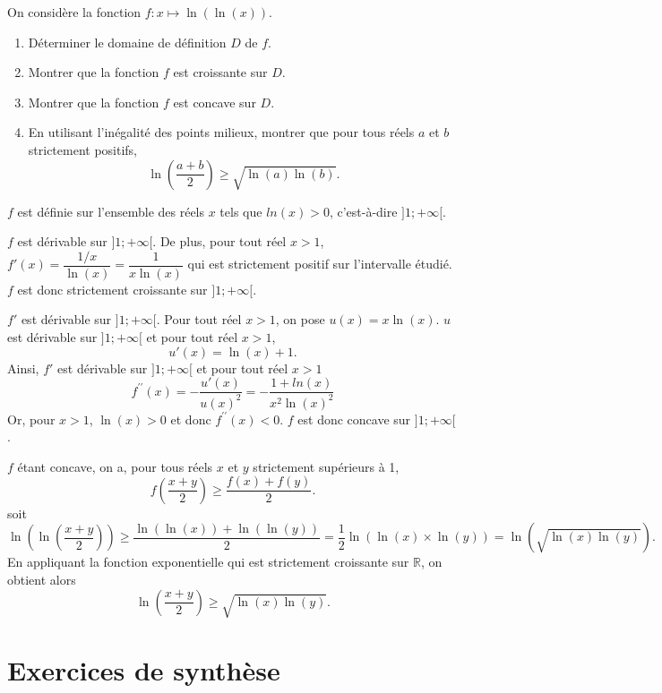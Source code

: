 \documentclass[11pt,fleqn, openany]{book} %
\begin{document}
\begin{exercise}On considère la fonction $f : x \mapsto \ln( \ln(x))$.
\begin{enumerate}
\item Déterminer le domaine de définition $D$ de $f$.
\item Montrer que la fonction $f$ est croissante sur $D$.
\item Montrer que la fonction $f$ est concave sur $D$.
\item En utilisant l'inégalité des points milieux, montrer que pour tous réels $a$ et $b$ strictement positifs,
\[ \ln \left( \dfrac{a+b}{2}\right) \geqslant \sqrt{\ln(a) \ln(b)}.\]
\end{enumerate}\end{exercise}

\begin{solution}
\(f\) est définie sur l'ensemble des réels \(x\) tels que \(ln(x)>0\), c'est-à-dire \(]1;+\infty[\).

\(f\) est dérivable sur  \(]1;+\infty[\). De plus, pour tout réel \(x>1\), \(f'(x)=\dfrac{1/x}{\ln(x)}=\dfrac{1}{x\ln(x)}\) qui est strictement positif sur l'intervalle étudié. \(f\) est donc strictement croissante sur \(]1;+\infty[\).

\(f'\) est dérivable sur \(]1;+\infty[\). Pour tout réel \(x>1\), on pose \(u(x)=x\ln(x)\). \(u\) est dérivable sur \(]1;+\infty[\) et pour tout réel \(x>1\),
\[u'(x)=\ln(x)+1.\]
Ainsi, \(f'\) est dérivable sur \(]1;+\infty[\) et pour tout réel \(x>1\)
\[f^{\prime\prime}(x)= -\dfrac{u'(x)}{u(x)^2}=-\dfrac{1+ln(x)}{x^2\ln(x)^2}\]
Or, pour \(x>1\), \(\ln(x)>0\) et donc \(f^{\prime\prime}(x)<0\).  \(f\) est donc concave sur \(]1;+\infty[\).

\(f\) étant concave, on a, pour tous réels \(x\) et \(y\) strictement supérieurs à 1,
\[f\left(\dfrac{x+y}{2}\right) \geqslant \dfrac{f(x)+f(y)}{2}.\] 
soit
\[\ln\left(\ln\left(\dfrac{x+y}{2}\right)\right) \geqslant \dfrac{\ln(\ln(x))+\ln(\ln(y))}{2}=\dfrac{1}{2}\ln\left( \ln(x) \times \ln(y)\right)=\ln\left(\sqrt{\ln(x)\ln(y)}\right) .\] 
En appliquant la fonction exponentielle qui est strictement croissante sur \(\mathbb{R}\), on obtient alors
\[ \ln \left( \dfrac{x+y}{2}\right) \geqslant \sqrt{\ln(x)\ln(y)} .\]\end{solution}





\section*{Exercices de synthèse}
\end{document}
